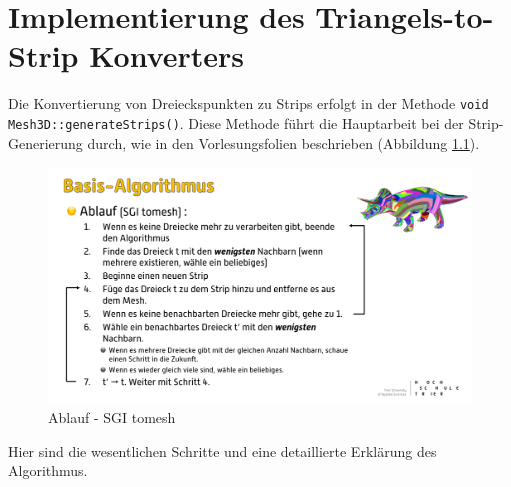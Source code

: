 \chapter{Implementierung des Triangels-to-Strip Konverters}

Die Konvertierung von Dreieckspunkten zu Strips erfolgt in der Methode \break
\lstinline{void Mesh3D::generateStrips()}. Diese Methode führt die Hauptarbeit
bei der Strip-Generierung durch, wie in den Vorlesungsfolien beschrieben
(Abbildung \ref{fig:SGI}). 

\begin{figure}[ht]
    \centering
    \includegraphics[scale = 0.3]{images/SGI-tomesh.PNG}
    \caption{Ablauf - SGI tomesh}
	\label{fig:SGI}
\end{figure} 
\hfil \break
Hier sind die wesentlichen Schritte und eine detaillierte Erklärung des
Algorithmus.
